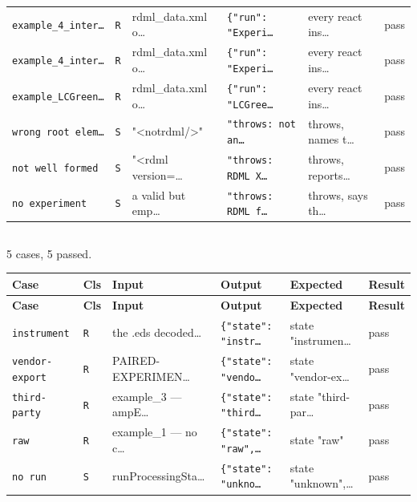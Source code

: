 {\begin{xltabular}{\linewidth}{|X|l|l|l|l|l|}
\texttt{example\_4\_inter…} & \texttt{R} & rdml\_data.xml o… & \texttt{\{"run": "Experi…} & every react ins… & pass \\
\texttt{example\_4\_inter…} & \texttt{R} & rdml\_data.xml o… & \texttt{\{"run": "Experi…} & every react ins… & pass \\
\texttt{example\_LCGreen…} & \texttt{R} & rdml\_data.xml o… & \texttt{\{"run": "LCGree…} & every react ins… & pass \\
\texttt{wrong root elem…} & \texttt{S} & "<notrdml/>" & \texttt{"throws: not an…} & throws, names t… & pass \\
\texttt{not well formed} & \texttt{S} & "<rdml version=… & \texttt{"throws: RDML X…} & throws, reports… & pass \\
\texttt{no experiment} & \texttt{S} & a valid but emp… & \texttt{"throws: RDML f…} & throws, says th… & pass \\
\bottomrule
\end{xltabular}}

\subsection*{}
{\small 5 cases, 5 passed.}\par
{\small
\begin{xltabular}{\linewidth}{|X|l|l|l|l|l|}
\toprule \textbf{Case} & \textbf{Cls} & \textbf{Input} & \textbf{Output} & \textbf{Expected} & \textbf{Result} \\\midrule\endfirsthead
\toprule \textbf{Case} & \textbf{Cls} & \textbf{Input} & \textbf{Output} & \textbf{Expected} & \textbf{Result} \\\midrule\endhead
\texttt{instrument} & \texttt{R} & the .eds decoded… & \texttt{\{"state": "instr…} & state "instrumen… & pass \\
\texttt{vendor-export} & \texttt{R} & PAIRED-EXPERIMEN… & \texttt{\{"state": "vendo…} & state "vendor-ex… & pass \\
\texttt{third-party} & \texttt{R} & example\_3 — ampE… & \texttt{\{"state": "third…} & state "third-par… & pass \\
\texttt{raw} & \texttt{R} & example\_1 — no c… & \texttt{\{"state": "raw",…} & state "raw" & pass \\
\texttt{no run} & \texttt{S} & runProcessingSta… & \texttt{\{"state": "unkno…} & state "unknown",… & pass \\
\bottomrule
\end{xltabular}}

